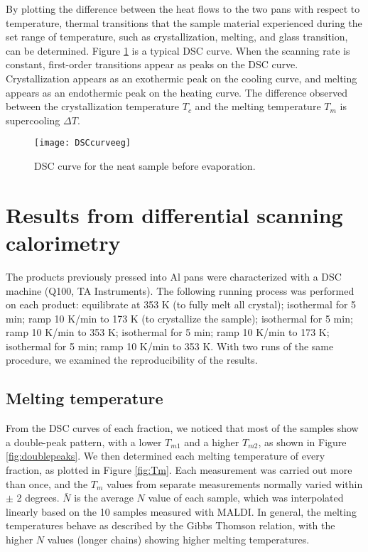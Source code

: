 By plotting the difference between the heat flows to the two pans with respect to temperature, thermal transitions that the sample material experienced during the set range of temperature, such as crystallization, melting, and glass transition, can be determined. Figure \ref{fig:DSCcurveeg} is a typical DSC curve. When the scanning rate is constant, first-order transitions appear as peaks on the DSC curve. Crystallization appears as an exothermic peak on the cooling curve, and melting appears as an endothermic peak on the heating curve. The difference observed between the crystallization temperature $T_{c}$ and the melting temperature $T_{m}$ is supercooling $\Delta T$.

\begin{figure}[H]
\center
\texttt{[image: DSCcurveeg]}
\caption{DSC curve for the neat sample before evaporation.}
\label{fig:DSCcurveeg}
\end{figure}

\section{Results from differential scanning calorimetry}

The products previously pressed into Al pans were characterized with a DSC machine (Q100, TA Instruments). The following running process was performed on each product: equilibrate at 353 K (to fully melt all crystal); isothermal for 5 min; ramp 10 K/min to 173 K (to crystallize the sample); isothermal for 5 min; ramp 10 K/min to 353 K; isothermal for 5 min; ramp 10 K/min to 173 K; isothermal for 5 min; ramp 10 K/min to 353 K. With two runs of the same procedure, we examined the reproducibility of the results.

\subsection{Melting temperature}

From the DSC curves of each fraction, we noticed that most of the samples show a double-peak pattern, with a lower $T_{m1}$ and a higher $T_{m2}$, as shown in Figure \ref{fig:doublepeaks}. We then determined each melting temperature of every fraction, as plotted in Figure \ref{fig:Tm}.  Each measurement was carried out more than once, and the $T_{m}$ values from separate measurements normally varied within $\pm$ 2 degrees. $\bar{N}$ is the average $N$ value of each sample, which was interpolated linearly based on the 10 samples measured with MALDI. In general, the melting temperatures behave as described by the Gibbs Thomson relation, with the higher $N$ values (longer chains) showing higher melting temperatures.

